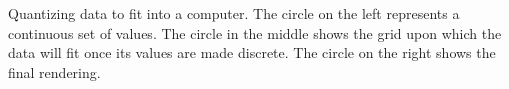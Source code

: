 Quantizing data to fit into a computer. The circle on the left represents a continuous set of values. The circle in the middle shows the grid upon which the data will fit once its values are made discrete. The circle on the right shows the final rendering.